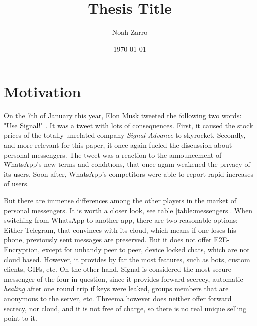 \documentclass[a4paper, oneside]{discothesis}
\title{Thesis Title}
\author{Noah Zarro}
\institute{Distributed Computing Group \\[2pt]
Computer Engineering and Networks Laboratory \\[2pt]
ETH Zürich}
\date{\today}
\begin{document}
\frontmatter %
\maketitle

\cleardoublepage

\begin{acknowledgements}

\end{acknowledgements}


\begin{abstract}

\end{abstract}

\tableofcontents

\mainmatter %


\chapter{Motivation}
On the 7th of January this year, Elon Musk tweeted the following two words: "Use Signal!" \cite{Twitter}. It was a tweet with lots of consequences. First, it caused the stock prices of the totally unrelated company \emph{Signal Advance} to skyrocket. Secondly, and more relevant for this paper, it once again fueled the discussion about personal messengers. The tweet was a reaction to the announcement of WhatsApp's new terms and conditions, that once again weakened the privacy of its users. Soon after, WhatsApp's competitors were able to report rapid increases of users.

But there are immense differences among the other players in the market of personal messengers. It is worth a closer look, see table \ref{table:messengers}. When switching from WhatsApp to another app, there are two reasonable options: Either Telegram, that convinces with its cloud, which means if one loses his phone, previously sent messages are preserved. But it does not offer E2E-Encryption, except for unhandy peer to peer, device locked chats, which are not cloud based. However, it provides by far the most features, such as bots, custom clients, GIFs, etc. On the other hand, Signal is considered the most secure messenger of the four in question, since it provides forward secrecy, automatic \emph{healing} after one round trip if keys were leaked, groups members that are anonymous to the server, etc. Threema however does neither offer forward secrecy, nor cloud, and it is not free of charge, so there is no real unique selling point to it.
\end{document}
